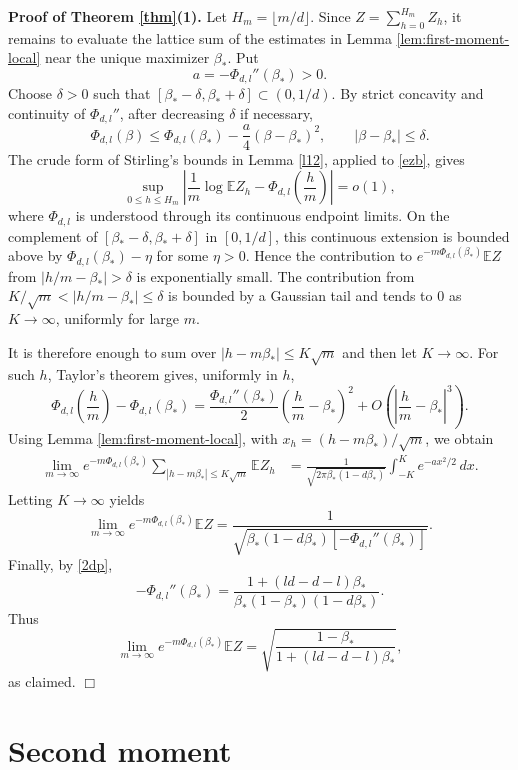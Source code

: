 \documentclass[11pt]{amsart}
\theoremstyle{plain}
\numberwithin{equation}{section}
\numberwithin{theorem}{section}
\numberwithin{figure}{section}
\begin{document}
\noindent\textbf{Proof of Theorem \ref{thm}(1).}
Let $H_m=\lfloor m/d\rfloor$.  Since $Z=\sum_{h=0}^{H_m}Z_h$, it remains to evaluate the lattice sum of the estimates in Lemma \ref{lem:first-moment-local} near the unique maximizer $\beta_*$.  Put
\[
a=-\Phi_{d,l}''(\beta_*)>0.
\]
Choose $\delta>0$ such that $[\beta_* -\delta,\beta_*+\delta]\subset(0,1/d)$.  By strict concavity and continuity of $\Phi_{d,l}''$, after decreasing $\delta$ if necessary,
\[
\Phi_{d,l}(\beta)\leq \Phi_{d,l}(\beta_*)-\frac{a}{4}(\beta-\beta_*)^2,
\qquad |\beta-\beta_*|\leq\delta .
\]
The crude form of Stirling's bounds in Lemma \ref{l12}, applied to \eqref{ezb}, gives
\[
\sup_{0\leq h\leq H_m}
\left|\frac1m\log \mathbb{E}Z_h-\Phi_{d,l}\left(\frac{h}{m}\right)\right|=o(1),
\]
where $\Phi_{d,l}$ is understood through its continuous endpoint limits.  On the complement of $[\beta_* -\delta,\beta_*+\delta]$ in $[0,1/d]$, this continuous extension is bounded above by $\Phi_{d,l}(\beta_*)-\eta$ for some $\eta>0$.  Hence the contribution to $e^{-m\Phi_{d,l}(\beta_*)}\mathbb{E}Z$ from $|h/m-\beta_*|>\delta$ is exponentially small.  The contribution from $K/\sqrt{m}<|h/m-\beta_*|\leq\delta$ is bounded by a Gaussian tail and tends to $0$ as $K\to\infty$, uniformly for large $m$.

It is therefore enough to sum over $|h-m\beta_*|\leq K\sqrt{m}$ and then let $K\to\infty$.  For such $h$, Taylor's theorem gives, uniformly in $h$,
\[
\Phi_{d,l}\left(\frac{h}{m}\right)-\Phi_{d,l}(\beta_*)
=\frac{\Phi_{d,l}''(\beta_*)}{2}\left(\frac{h}{m}-\beta_*\right)^2
+O\left(\left|\frac{h}{m}-\beta_*\right|^3\right).
\]
Using Lemma \ref{lem:first-moment-local}, with $x_h=(h-m\beta_*)/\sqrt{m}$, we obtain
\begin{align*}
\lim_{m\to\infty} e^{-m\Phi_{d,l}(\beta_*)}
\sum_{|h-m\beta_*|\leq K\sqrt{m}}\mathbb{E}Z_h
&=\frac{1}{\sqrt{2\pi\beta_*(1-d\beta_*)}}
\int_{-K}^{K} e^{-a x^2/2}\,dx .
\end{align*}
Letting $K\to\infty$ yields
\[
\lim_{m\to\infty}e^{-m\Phi_{d,l}(\beta_*)}\mathbb{E}Z
=\frac{1}{\sqrt{\beta_*(1-d\beta_*)[-\Phi_{d,l}''(\beta_*)]}}.
\]
Finally, by \eqref{2dp},
\[
-\Phi_{d,l}''(\beta_*)
=\frac{1+(ld-d-l)\beta_*}{\beta_*(1-\beta_*)(1-d\beta_*)}.
\]
Thus
\[
\lim_{m\to\infty}e^{-m\Phi_{d,l}(\beta_*)}\mathbb{E}Z
=\sqrt{\frac{1-\beta_*}{1+(ld-d-l)\beta_*}},
\]
as claimed.
\hfill$\Box$



\section{Second moment}\label{sm}
\end{document}
